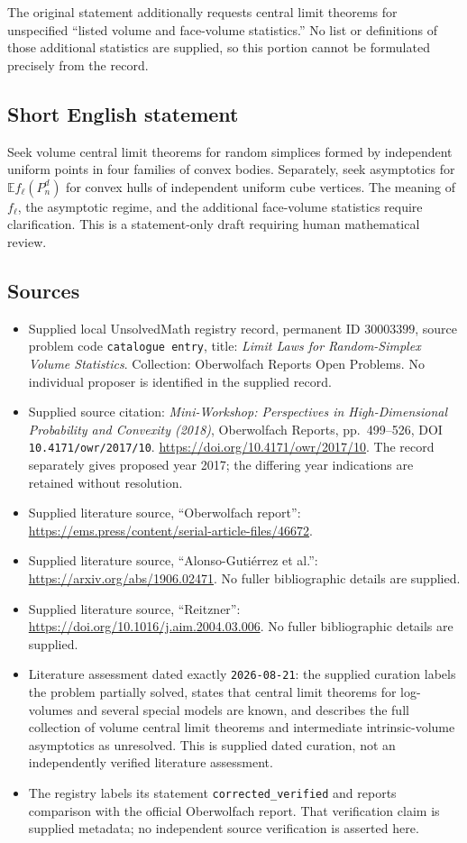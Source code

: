 \documentclass[11pt]{article}
\begin{document}
The original statement additionally requests central limit theorems for unspecified ``listed volume and face-volume statistics.'' No list or definitions of those additional statistics are supplied, so this portion cannot be formulated precisely from the record.
\subsection{Short English statement}
Seek volume central limit theorems for random simplices formed by independent uniform points in four families of convex bodies. Separately, seek asymptotics for \(\mathbb E f_\ell(P_n^d)\) for convex hulls of independent uniform cube vertices. The meaning of \(f_\ell\), the asymptotic regime, and the additional face-volume statistics require clarification. This is a statement-only draft requiring human mathematical review.
\subsection{Sources}
\begin{itemize}
\item Supplied local UnsolvedMath registry record, permanent ID \(30003399\), source problem code \texttt{catalogue entry}, title: \emph{Limit Laws for Random-Simplex Volume Statistics}. Collection: Oberwolfach Reports Open Problems. No individual proposer is identified in the supplied record.
\item Supplied source citation: \emph{Mini-Workshop: Perspectives in High-Dimensional Probability and Convexity (2018)}, Oberwolfach Reports, pp.\ 499--526, DOI \texttt{10.4171/owr/2017/10}. \url{https://doi.org/10.4171/owr/2017/10}. The record separately gives proposed year 2017; the differing year indications are retained without resolution.
\item Supplied literature source, ``Oberwolfach report'': \url{https://ems.press/content/serial-article-files/46672}.
\item Supplied literature source, ``Alonso-Guti\'errez et al.'': \url{https://arxiv.org/abs/1906.02471}. No fuller bibliographic details are supplied.
\item Supplied literature source, ``Reitzner'': \url{https://doi.org/10.1016/j.aim.2004.03.006}. No fuller bibliographic details are supplied.
\item Literature assessment dated exactly \texttt{2026-08-21}: the supplied curation labels the problem partially solved, states that central limit theorems for log-volumes and several special models are known, and describes the full collection of volume central limit theorems and intermediate intrinsic-volume asymptotics as unresolved. This is supplied dated curation, not an independently verified literature assessment.
\item The registry labels its statement \texttt{corrected\_verified} and reports comparison with the official Oberwolfach report. That verification claim is supplied metadata; no independent source verification is asserted here.
\end{itemize}
\end{document}

